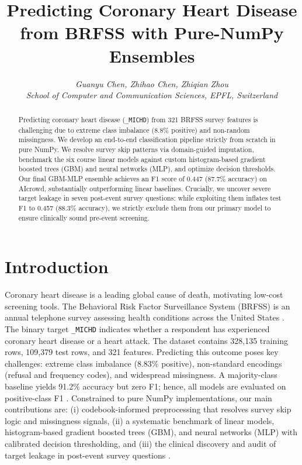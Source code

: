 \documentclass[10pt,conference,compsocconf]{IEEEtran}
\begin{document}
\title{Predicting Coronary Heart Disease from BRFSS with Pure-NumPy Ensembles}

\author{
  \textit{Guanyu Chen, Zhihao Chen, Zhiqian Zhou}\\
  \textit{School of Computer and Communication Sciences, EPFL, Switzerland}
}

\maketitle

\begin{abstract}
Predicting coronary heart disease (\texttt{\_MICHD}) from 321 BRFSS survey features is challenging due to extreme class imbalance (8.8\% positive) and non-random missingness. We develop an end-to-end classification pipeline strictly from scratch in pure NumPy. We resolve survey skip patterns via domain-guided imputation, benchmark the six course linear models against custom histogram-based gradient boosted trees (GBM) and neural networks (MLP), and optimize decision thresholds. Our final GBM-MLP ensemble achieves an F1 score of 0.447 (87.7\% accuracy) on AIcrowd, substantially outperforming linear baselines. Crucially, we uncover severe target leakage in seven post-event survey questions: while exploiting them inflates test F1 to 0.457 (88.3\% accuracy), we strictly exclude them from our primary model to ensure clinically sound pre-event screening.
\end{abstract}

\section{Introduction}
Coronary heart disease is a leading global cause of death, motivating low-cost screening tools. The Behavioral Risk Factor Surveillance System (BRFSS) is an annual telephone survey assessing health conditions across the United States \cite{brfss2015}. The binary target \texttt{\_MICHD} indicates whether a respondent has experienced coronary heart disease or a heart attack. The dataset contains 328,135 training rows, 109,379 test rows, and 321 features. Predicting this outcome poses key challenges: extreme class imbalance (8.83\% positive), non-standard encodings (refusal and frequency codes), and widespread missingness. A majority-class baseline yields 91.2\% accuracy but zero F1; hence, all models are evaluated on positive-class F1 \cite{vanrijsbergen1979}. Constrained to pure NumPy implementations, our main contributions are: (i) codebook-informed preprocessing that resolves survey skip logic and missingness signals, (ii) a systematic benchmark of linear models, histogram-based gradient boosted trees (GBM), and neural networks (MLP) with calibrated decision thresholding, and (iii) the clinical discovery and audit of target leakage in post-event survey questions \cite{kaufman2012leakage}.
\end{document}
